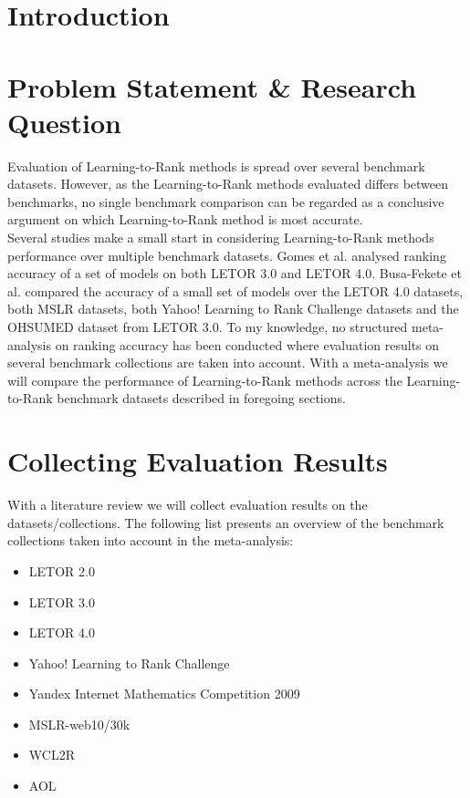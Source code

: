 \documentclass{sig-alternate-2013}
\begin{document}
\terms{}

\keywords{}

\section{Introduction}


\section{Problem Statement \& Research Question}
\label{chap:cross_comparison}
Evaluation of Learning-to-Rank methods is spread over several benchmark datasets. However, as the Learning-to-Rank methods evaluated differs between benchmarks, no single benchmark comparison can be regarded as a conclusive argument on which Learning-to-Rank method is most accurate.\\

Several studies make a small start in considering Learning-to-Rank methods performance over multiple benchmark datasets. Gomes et al. \cite{Gomes2013} analysed ranking accuracy of a set of models on both LETOR 3.0 and LETOR 4.0. Busa-Fekete et al. \cite{Busa-Fekete2013} compared the accuracy of a small set of models over the LETOR 4.0 datasets, both MSLR datasets, both Yahoo! Learning to Rank Challenge datasets and the OHSUMED dataset from LETOR 3.0. To my knowledge, no structured meta-analysis on ranking accuracy has been conducted where evaluation results on several benchmark collections are taken into account. With a meta-analysis we will compare the performance of Learning-to-Rank methods across the Learning-to-Rank benchmark datasets described in foregoing sections.

\section{Collecting Evaluation Results}
\label{sec:collecting_evaluation_results}
With a literature review we will collect evaluation results on the datasets/collections. The following list presents an overview of the benchmark collections taken into account in the meta-analysis:
\begin{itemize}\itemsep0em
\item LETOR 2.0
\item LETOR 3.0
\item LETOR 4.0
\item Yahoo! Learning to Rank Challenge
\item Yandex Internet Mathematics Competition 2009
\item MSLR-web10/30k
\item WCL2R
\item AOL
\end{itemize}
\end{document}
